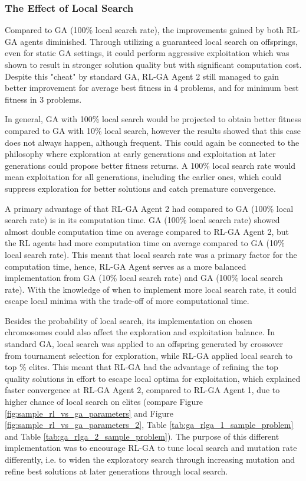 \documentclass{article}
\begin{document}
\subsubsection{The Effect of Local Search}
Compared to GA (100\% local search rate), the improvements gained by both RL-GA agents diminished. Through utilizing a guaranteed local search on offsprings, even for static GA settings, it could perform aggressive exploitation which was shown to result in stronger solution quality but with significant computation cost. Despite this "cheat" by standard GA, RL-GA Agent 2 still managed to gain better improvement for average best fitness in 4 problems, and for minimum best fitness in 3 problems. 

In general, GA with 100\% local search would be projected to obtain better fitness compared to GA with 10\% local search, however the results showed that this case does not always happen, although frequent. This could again be connected to the philosophy where exploration at early generations and exploitation at later generations could propose better fitness returns. A 100\% local search rate would mean exploitation for all generations, including the earlier ones, which could suppress exploration for better solutions and catch premature convergence.

A primary advantage of that RL-GA Agent 2 had compared to GA (100\% local search rate) is in its computation time. GA (100\% local search rate) showed almost double computation time on average compared to RL-GA Agent 2, but the RL agents had more computation time on average compared to GA (10\% local search rate). This meant that local search rate was a primary factor for the computation time, hence, RL-GA Agent serves as a more balanced implementation from GA (10\% local search rate) and GA (100\% local search rate). With the knowledge of when to implement more local search rate, it could escape local minima with the trade-off of more computational time.

Besides the probability of local search, its implementation on chosen chromosomes could also affect the exploration and exploitation balance. In standard GA, local search was applied to an offspring generated by crossover from tournament selection for exploration, while RL-GA applied local search to top \% elites. This meant that RL-GA had the advantage of refining the top quality solutions in effort to escape local optima for exploitation, which explained faster convergence at RL-GA Agent 2, compared to RL-GA Agent 1, due to higher chance of local search on elites (compare Figure \ref{fig:sample_rl_vs_ga_parameters} and Figure \ref{fig:sample_rl_vs_ga_parameters_2}, Table \ref{tab:ga_rlga_1_sample_problem} and Table \ref{tab:ga_rlga_2_sample_problem}). The purpose of this different implementation was to encourage RL-GA to tune local search and mutation rate differently, i.e. to widen the exploratory search through increasing mutation and refine best solutions at later generations through local search. 
\end{document}
